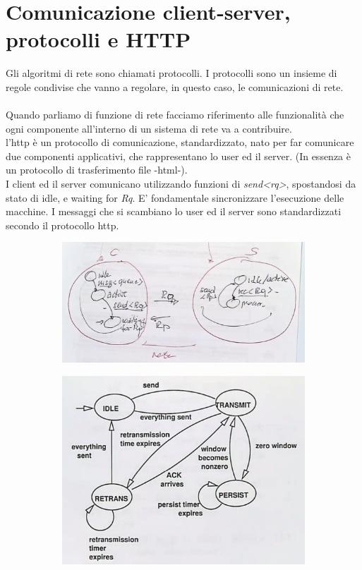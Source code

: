 \documentclass[11pt, oneside]{article}   	%
\begin{document}
\section*{Comunicazione client-server, protocolli e HTTP}
Gli algoritmi di rete sono chiamati protocolli. I protocolli sono un insieme di regole condivise che vanno a regolare, in questo caso, le comunicazioni di rete.\\\\
Quando parliamo di funzione di rete facciamo riferimento alle funzionalità che ogni componente all'interno di un sistema di rete va a contribuire.\\
l'http è un protocollo di comunicazione, standardizzato, nato per far comunicare due componenti applicativi, che rappresentano lo user ed il server. (In essenza è un protocollo di trasferimento file -html-).\\
I client ed il server comunicano utilizzando funzioni di \emph{send<rq>}, spostandosi da stato di idle, e waiting for \emph{Rq}. E' fondamentale sincronizzare l'esecuzione delle macchine. I messaggi che si scambiano lo user ed il server sono standardizzati secondo il protocollo http.
\begin{figure}[H]
\begin{subfigure}[h]{0.5\linewidth}
\includegraphics[width=\linewidth]{cs}
\end{subfigure}
\hfill
\begin{subfigure}[h]{0.4\linewidth}
\includegraphics[width=\linewidth]{cs2}
\end{subfigure}%
\end{figure}
\end{document}
